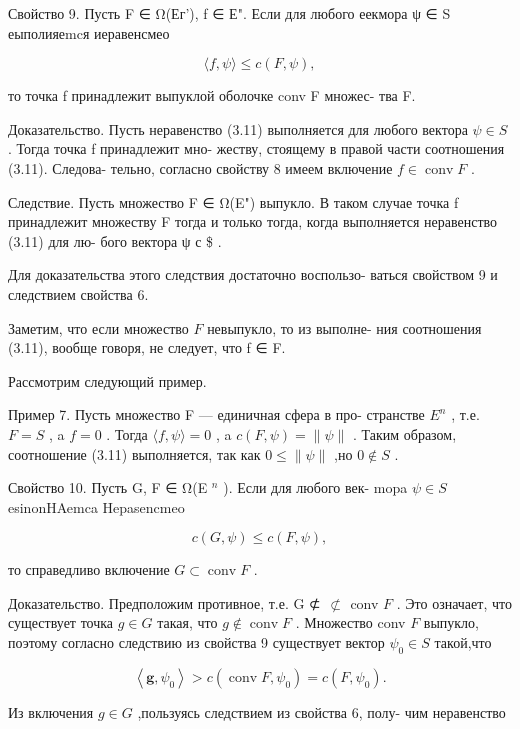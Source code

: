 \documentclass[8pt]{extarticle}
\begin{document}
Свойство 9. Пусть F ∈ Ω(Ег’), f ∈ Е". Если для любого еекмора ψ ∈ S еыполияеmcя иеравенсмео

\[
\langle f,\psi \rangle  \leq  c\left( {F,\psi }\right) , \tag{3.11}
\]

то точка f принадлежит выпуклой оболочке conv F множес- тва F.

Доказательство. Пусть неравенство (3.11) выполняется для любого вектора \(\psi  \in  S\) . Тогда точка f принадлежит мно- жеству, стоящему в правой части соотношения (3.11). Следова- тельно, согласно свойству 8 имеем включение \(f \in  \operatorname{conv}F\) .

Следствие. Пусть множество F ∈ Ω(E") выпукло. В таком случае точка f принадлежит множеству F тогда и только тогда, когда выполняется неравенство (3.11) для лю- бого вектора ψ с \$ .

Для доказательства этого следствия достаточно воспользо- ваться свойством 9 и следствием свойства 6.

Заметим, что если множество \(F\) невыпукло, то из выполне- ния соотношения (3.11), вообще говоря, не следует, что f ∈ F.

Рассмотрим следующий пример.

Пример 7. Пусть множество F — единичная сфера в про- странстве \({E}^{n}\) , т.е. \(F = S\) , a \(f = 0\) . Тогда \(\langle f,\psi \rangle  = 0\) , a \(c\left( {F,\psi }\right)  = \parallel \psi \parallel\) . Таким образом, соотношение (3.11) выполняется, так как \(0 \leq  \parallel \psi \parallel\) ,но \(0 \notin  S\) .

Свойство 10. Пусть G, F ∈ Ω(E \({}^{n}\) ). Если для любого век- mopa \(\psi  \in  S\) esinonHAemca Hepasencmeo

\[
c\left( {G,\psi }\right)  \leq  c\left( {F,\psi }\right) , \tag{3.12}
\]

то справедливо включение \(G \subset  \operatorname{conv}F\) .

Доказательство. Предположим противное, т.е. G ⊄ \(\text{ ⊄ }\) conv \(F\) . Это означает, что существует точка \(g \in  G\) такая, что \(g \notin  \operatorname{conv}F\) . Множество conv \(F\) выпукло, поэтому согласно следствию из свойства 9 существует вектор \({\psi }_{0} \in  S\) такой,что

\[
\left\langle  {\mathbf{g},{\psi }_{0}}\right\rangle   > c\left( {\operatorname{conv}F,{\psi }_{0}}\right)  = c\left( {F,{\psi }_{0}}\right) .
\]

Из включения \(g \in  G\) ,пользуясь следствием из свойства 6, полу- чим неравенство
\end{document}

